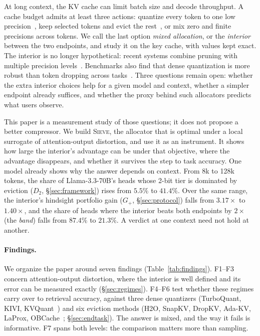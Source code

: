 \documentclass{article}
\newcommand{\sieve}{\textsc{Sieve}}
\newcommand{\gplus}{G_{+}}
\theoremstyle{definition}
\begin{document}
At long context, the KV cache can limit batch size and decode throughput.  A cache budget admits at least three actions: quantize every token to one low precision~\citep{liu2024kivi,hooper2024kvquant,zandieh2025turboquant}, keep selected tokens and evict the rest~\citep{zhang2023h2o,liu2023scissorhands,li2024snapkv,xiao2024streamingllm}, or mix zero and finite precisions across tokens.  We call the last option \emph{mixed allocation}, or the \emph{interior} between the two endpoints, and study it on the key cache, with values kept exact.  The interior is no longer hypothetical: recent systems combine pruning with multiple precision levels~\citep{zhang2025diffkv,wang-etal-2026-hqekv}.  Benchmarks also find that dense quantization is more robust than token dropping across tasks~\citep{yuan2024kvbench}.  Three questions remain open: whether the extra interior choices help for a given model and context, whether a simpler endpoint already suffices, and whether the proxy behind such allocators predicts what users observe.

This paper is a measurement study of those questions; it does not propose a better compressor.  We build \sieve{}, the allocator that is optimal under a local surrogate of attention-output distortion, and use it as an instrument.  It shows how large the interior's advantage can be under that objective, where the advantage disappears, and whether it survives the step to task accuracy.  One model already shows why the answer depends on context.  From 8k to 128k tokens, the share of Llama-3.3-70B's heads whose 2-bit tier is dominated by eviction ($D_2$, \S\ref{sec:framework}) rises from $5.5\%$ to $41.4\%$.  Over the same range, the interior's hindsight portfolio gain ($\gplus$, \S\ref{sec:protocol}) falls from $3.17\times$ to $1.40\times$, and the share of heads where the interior beats both endpoints by $2\times$ (the \emph{band}) falls from $87.4\%$ to $21.3\%$.  A verdict at one context need not hold at another.

\paragraph{Findings.}  We organize the paper around seven findings (Table~\ref{tab:findings}).  F1--F3 concern attention-output distortion, where the interior is well defined and its error can be measured exactly (\S\ref{sec:regimes}).  F4--F6 test whether these regimes carry over to retrieval accuracy, against three dense quantizers (TurboQuant, KIVI, KVQuant~\citep{zandieh2025turboquant,liu2024kivi,hooper2024kvquant}) and six eviction methods (H2O, SnapKV, DropKV, Ada-KV, LaProx, OBCache~\citep{zhang2023h2o,li2024snapkv,zhang2026dropkv,feng2024adakv,mai2026laprox,gu2026obcache}; \S\ref{sec:endtask}).  The answer is mixed, and the way it fails is informative.  F7 spans both levels: the comparison matters more than sampling.
\end{document}

